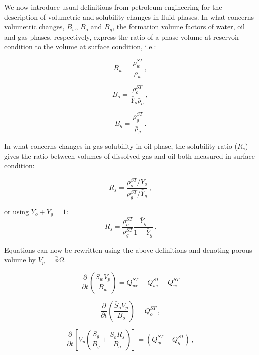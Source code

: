 \documentclass[final,authoryear,5p,times,twocolumn,10pt]{elsarticle}
\begin{document}
We now introduce usual definitions from petroleum engineering for the description of volumetric and solubility changes in fluid phases. In what concerns volumetric changes, $B_w$, $B_o$ and $B_g$, the formation volume factors of water, oil and gas phases, respectively, express the ratio of a phase volume at reservoir condition to the volume at surface condition, i.e.:

\begin{equation}\label{eq: Bw}
B_w = \frac{\rho_w^{ST}}{\bar{\rho}_w} \, ,
\end{equation}

\begin{equation}\label{eq: Bo}
B_o = \frac{\rho_o^{ST}}{\bar{Y}_o \bar{\rho}_o} \, ,
\end{equation}

\begin{equation}\label{eq: Bg}
B_g = \frac{\rho_g^{ST}}{\bar{\rho}_g} \, .
\end{equation}

In what concerns changes in gas solubility in oil phase, the solubility ratio ($R_s$) gives the ratio between volumes of dissolved gas and oil both measured in surface condition:

\begin{equation}
R_s = \frac{\rho_o^{ST} / \bar{Y}_o}{\rho_g^{ST} / \bar{Y}_g} \, ,
\end{equation}

or using $\bar{Y}_o + \bar{Y}_g = 1$:
\begin{equation}
R_s = \frac{\rho_o^{ST}}{\rho_g^{ST}}\frac{\bar{Y}_g}{1-\bar{Y}_g} \, .
\end{equation}

Equations can now be rewritten using the above definitions and denoting porous volume by $V_p = \bar{\phi}\Omega$.

\begin{equation}\label{eq: Sw4}
\frac{\partial}{\partial t} \left(\frac{\bar{S}_w V_p}{B_w} \right) = Q_{we}^{ST} + Q_{wi}^{ST}-Q_w^{ST}
\end{equation}

\begin{equation}\label{eq: So4}
\frac{\partial}{\partial t} \left(\frac{\bar{S}_o V_p}{B_o} \right) = Q_o^{ST} \, ,
\end{equation}

\begin{equation}\label{eq: Sg4}
\frac{\partial}{\partial t} \left[ V_p \left(\frac{\bar{S}_g}{B_g} + \frac{\bar{S}_o R_s}{B_o} \right) \right] = \left( Q_{gi}^{ST}-Q_g^{ST} \right) \, ,
\end{equation}
\end{document}
